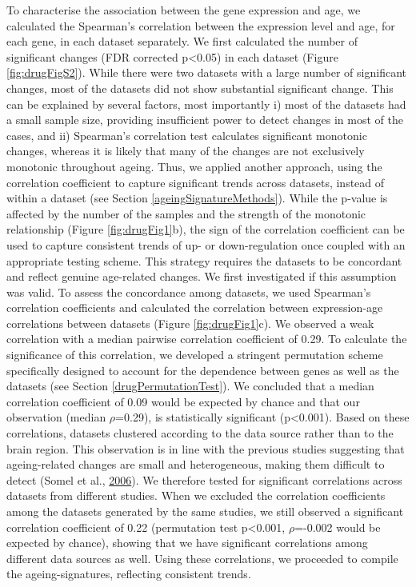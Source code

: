 \documentclass[12pt,twoside]{unicam}
\begin{document}
To characterise the association between the gene expression and age, we calculated the Spearman's correlation between the expression level and age, for each gene, in each dataset separately. We first calculated the number of significant changes (FDR corrected p\textless0.05) in each dataset (Figure \ref{fig:drugFigS2}). While there were two datasets with a large number of significant changes, most of the datasets did not show substantial significant change. This can be explained by several factors, most importantly i) most of the datasets had a small sample size, providing insufficient power to detect changes in most of the cases, and ii) Spearman's correlation test calculates significant monotonic changes, whereas it is likely that many of the changes are not exclusively monotonic throughout ageing. Thus, we applied another approach, using the correlation coefficient to capture significant trends across datasets, instead of within a dataset (see Section \ref{ageingSignatureMethods}). While the p-value is affected by the number of the samples and the strength of the monotonic relationship (Figure \ref{fig:drugFig1}b), the sign of the correlation coefficient can be used to capture consistent trends of up- or down-regulation once coupled with an appropriate testing scheme. This strategy requires the datasets to be concordant and reflect genuine age-related changes. We first investigated if this assumption was valid. To assess the concordance among datasets, we used Spearman's correlation coefficients and calculated the correlation between expression-age correlations between datasets (Figure \ref{fig:drugFig1}c). We observed a weak correlation with a median pairwise correlation coefficient of 0.29. To calculate the significance of this correlation, we developed a stringent permutation scheme specifically designed to account for the dependence between genes as well as the datasets (see Section \ref{drugPermutationTest}). We concluded that a median correlation coefficient of 0.09 would be expected by chance and that our observation (median \(\rho\)=0.29), is statistically significant (p\textless0.001). Based on these correlations, datasets clustered according to the data source rather than to the brain region. This observation is in line with the previous studies suggesting that ageing-related changes are small and heterogeneous, making them difficult to detect (Somel et al., \protect\hyperlink{ref-Somel2006}{2006}). We therefore tested for significant correlations across datasets from different studies. When we excluded the correlation coefficients among the datasets generated by the same studies, we still observed a significant correlation coefficient of 0.22 (permutation test p\textless0.001, \(\rho\)=-0.002 would be expected by chance), showing that we have significant correlations among different data sources as well. Using these correlations, we proceeded to compile the ageing-signatures, reflecting consistent trends.
\end{document}
